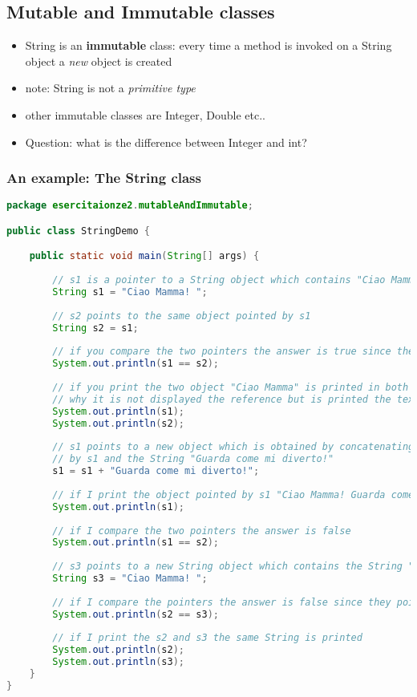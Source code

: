 \documentclass{article}
\begin{document}
\subsection{Mutable and Immutable classes }
\begin{itemize}
\item String is an \textbf{immutable} class: every time a method is invoked on a String object a \emph{new} object is created
\item note: String is not a \emph{primitive type}
\item other immutable classes are Integer, Double etc..
\item Question: what is the difference between Integer and int?
\end{itemize}

\subsubsection{An example: The String class}
\begin{lstlisting}[language=Java,escapechar=|]
package esercitaionze2.mutableAndImmutable;

public class StringDemo {

	public static void main(String[] args) {
		
		// s1 is a pointer to a String object which contains "Ciao Mamma"
		String s1 = "Ciao Mamma! ";
		
		// s2 points to the same object pointed by s1
		String s2 = s1;
		
		// if you compare the two pointers the answer is true since they point to the same object
		System.out.println(s1 == s2);
		
		// if you print the two object "Ciao Mamma" is printed in both the cases 
		// why it is not displayed the reference but is printed the text? we will see...
		System.out.println(s1);
		System.out.println(s2);
		
		// s1 points to a new object which is obtained by concatenating the string pointed
		// by s1 and the String "Guarda come mi diverto!"
		s1 = s1 + "Guarda come mi diverto!";
		
		// if I print the object pointed by s1 "Ciao Mamma! Guarda come mi diverto!" is printed
		System.out.println(s1);
		
		// if I compare the two pointers the answer is false
		System.out.println(s1 == s2);
	
		// s3 points to a new String object which contains the String "Ciao Mamma! "
		String s3 = "Ciao Mamma! ";
		
		// if I compare the pointers the answer is false since they points to different objects
		System.out.println(s2 == s3);
		
		// if I print the s2 and s3 the same String is printed
		System.out.println(s2);
		System.out.println(s3);
	}
}
\end{lstlisting}
\end{document}
